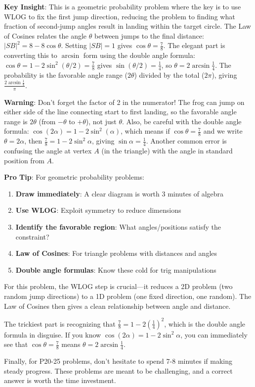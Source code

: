 \documentclass[12pt]{article}
\begin{document}
\begin{keyinsightbox}
\textbf{Key Insight}: This is a geometric probability problem where the key is to use WLOG to fix the first jump direction, reducing the problem to finding what fraction of second-jump angles result in landing within the target circle. The Law of Cosines relates the angle $\theta$ between jumps to the final distance: $|SB|^2 = 8 - 8\cos\theta$. Setting $|SB| = 1$ gives $\cos\theta = \frac{7}{8}$. The elegant part is converting this to $\arcsin$ form using the double angle formula: $\cos\theta = 1 - 2\sin^2(\theta/2) = \frac{7}{8}$ gives $\sin(\theta/2) = \frac{1}{4}$, so $\theta = 2\arcsin\frac{1}{4}$. The probability is the favorable angle range ($2\theta$) divided by the total ($2\pi$), giving $\frac{2\arcsin\frac{1}{4}}{\pi}$.
\end{keyinsightbox}

\begin{warningbox}
\textbf{Warning}: Don't forget the factor of 2 in the numerator! The frog can jump on either side of the line connecting start to first landing, so the favorable angle range is $2\theta$ (from $-\theta$ to $+\theta$), not just $\theta$. Also, be careful with the double angle formula: $\cos(2\alpha) = 1 - 2\sin^2(\alpha)$, which means if $\cos\theta = \frac{7}{8}$ and we write $\theta = 2\alpha$, then $\frac{7}{8} = 1 - 2\sin^2\alpha$, giving $\sin\alpha = \frac{1}{4}$. Another common error is confusing the angle at vertex $A$ (in the triangle) with the angle in standard position from $A$.
\end{warningbox}

\begin{tipbox}
\textbf{Pro Tip}: For geometric probability problems:
\begin{enumerate}
    \item \textbf{Draw immediately}: A clear diagram is worth 3 minutes of algebra
    \item \textbf{Use WLOG}: Exploit symmetry to reduce dimensions
    \item \textbf{Identify the favorable region}: What angles/positions satisfy the constraint?
    \item \textbf{Law of Cosines}: For triangle problems with distances and angles
    \item \textbf{Double angle formulas}: Know these cold for trig manipulations
\end{enumerate}

For this problem, the WLOG step is crucial—it reduces a 2D problem (two random jump directions) to a 1D problem (one fixed direction, one random). The Law of Cosines then gives a clean relationship between angle and distance.

The trickiest part is recognizing that $\frac{7}{8} = 1 - 2\left(\frac{1}{4}\right)^2$, which is the double angle formula in disguise. If you know $\cos(2\alpha) = 1 - 2\sin^2\alpha$, you can immediately see that $\cos\theta = \frac{7}{8}$ means $\theta = 2\arcsin\frac{1}{4}$.

Finally, for P20-25 problems, don't hesitate to spend 7-8 minutes if making steady progress. These problems are meant to be challenging, and a correct answer is worth the time investment.
\end{tipbox}
\end{document}
